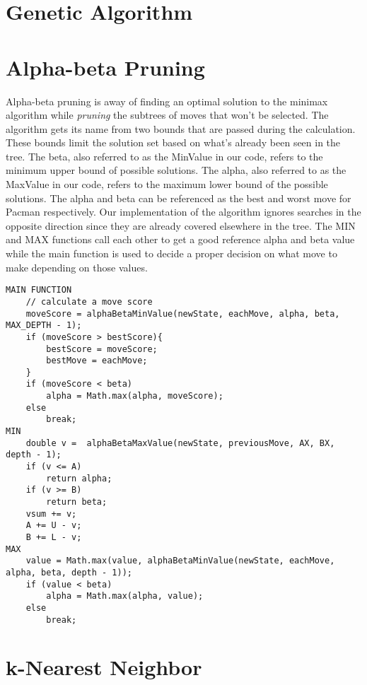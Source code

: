 \documentclass[a4paper,oneside,10pt]{report}
\begin{document}
\section{Genetic Algorithm}\label{genetic}

\section{Alpha-beta Pruning}\label{alphabeta}
Alpha-beta pruning is away of finding an optimal solution to the minimax algorithm while \textit{pruning} the subtrees of moves that won't be selected. The algorithm gets its name from two bounds that are passed during the calculation. These bounds limit the solution set based on what's already been seen in the tree. The beta, also referred to as the MinValue in our code, refers to the minimum upper bound of possible solutions. The alpha, also referred to as the MaxValue in our code, refers to the maximum lower bound of the possible solutions. The alpha and beta can be referenced as the best and worst move for Pacman respectively. Our implementation of the algorithm ignores searches in the opposite direction since they are already covered elsewhere in the tree. The MIN and MAX functions call each other to get a good reference alpha and beta value while the main function is used to decide a proper decision on what move to make depending on those values.

\begin{lstlisting}[caption=SNIPPETS: Alpha-beta Pruning Decision Making]
MAIN FUNCTION
    // calculate a move score
    moveScore = alphaBetaMinValue(newState, eachMove, alpha, beta, MAX_DEPTH - 1);	
    if (moveScore > bestScore){
        bestScore = moveScore;
        bestMove = eachMove;
    }
    if (moveScore < beta)
        alpha = Math.max(alpha, moveScore);
    else
        break;
MIN
    double v =  alphaBetaMaxValue(newState, previousMove, AX, BX, depth - 1);						  
    if (v <= A)
        return alpha;
    if (v >= B)
        return beta;
    vsum += v;
    A += U - v;
    B += L - v;
MAX
    value = Math.max(value, alphaBetaMinValue(newState, eachMove, alpha, beta, depth - 1));
    if (value < beta)
        alpha = Math.max(alpha, value);
    else 
        break;
\end{lstlisting}

\section{k-Nearest Neighbor}\label{knn}
\end{document}

